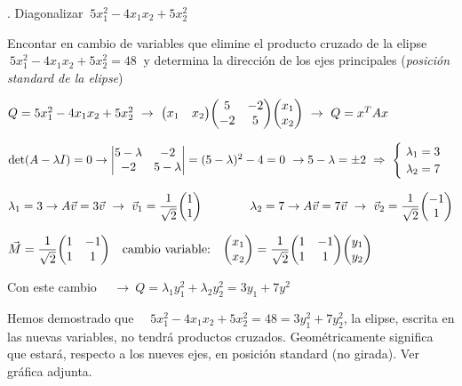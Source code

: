 \vspace{15mm} 

\begin{example}
. Diagonalizar $\ 5x_1^2-4x_1x_2+5x_2^2$	

\vspace{2mm} Encontar en cambio de variables que elimine el producto cruzado de la elipse $\ 5x_1^2-4x_1x_2+5x_2^2=48\ $ y determina la dirección de los ejes principales (\emph{posición standard de la elipse})	
\end{example}

$Q=5x_1^2-4x_1x_2+5x_2^2\ \to \ \mqty(x_1&x_2) \mqty(5&-2\\-2&5) \mqty (x_1\\x_2) \ \to \ Q=x^TAx$

$\det(A-\lambda I)=0 \to \mqty|5-\lambda & -2 \\ -2& 5-\lambda|=(5-\lambda)^2-4=0 \ \to 5-\lambda=\pm 2 \ \Rightarrow \ \begin{cases} \ \lambda_1=3 \\ \ \lambda_2=7 \end{cases}$

$\lambda_1=3 \to A\vec v = 3 \vec v \ \to \ \vec v_1=\dfrac 1{\sqrt{2}} \mqty(1\\1)
\qquad \qquad
\lambda_2=7 \to A\vec v = 7 \vec v \ \to \ \vec v_2=\dfrac 1{\sqrt{2}} \mqty(-1\\1)$

$\vec M=\dfrac 1{\sqrt{2}}\mqty(1&-1\\1&1)  \quad \text{cambio variable:} \quad \mqty(x_1\\x_2) = \dfrac 1{\sqrt{2}}\mqty(1&-1\\1&1) \mqty(y_1\\y_2)$

Con este cambio $\quad  \to \  Q=\lambda_1y_1^2+\lambda_2y_2^2=3y_1+7y^2$

Hemos demostrado que $\quad 5x_1^2-4x_1x_2+5x_2^2=48=3y_1^2+7y_2^2$, la elipse, escrita en las nuevas variables, no tendrá productos cruzados. Geométricamente significa que estará, respecto a los nueves ejes, en posición standard (no girada). Ver gráfica adjunta.

